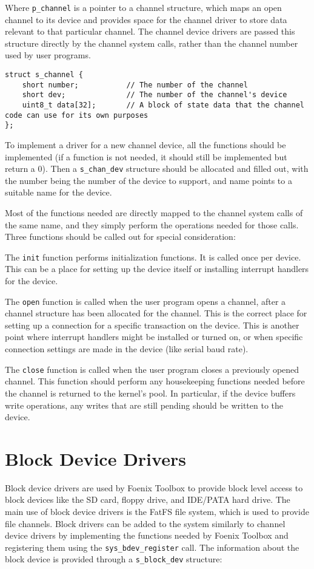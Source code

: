 Where \verb+p_channel+ is a pointer to a channel structure, which maps an open channel to its device and provides space for the channel driver to store data relevant to that particular channel. The channel device drivers are passed this structure directly by the channel system calls, rather than the channel number used by user programs.

\begin{lstlisting}
struct s_channel {
    short number;           // The number of the channel
    short dev;              // The number of the channel's device
    uint8_t data[32];       // A block of state data that the channel code can use for its own purposes
};
\end{lstlisting}

To implement a driver for a new channel device, all the functions should be implemented (if a function is not needed,
it should still be implemented but return a 0). Then a \verb+s_chan_dev+ structure should be allocated and filled out,
with the number being the number of the device to support, and name points to a suitable name for the device.

Most of the functions needed are directly mapped to the channel system calls of the same name, and they simply perform
the operations needed for those calls. Three functions should be called out for special consideration:

The \verb+init+ function performs initialization functions. It is called once per device.
This can be a place for setting up the device itself or installing interrupt handlers for the device.

The \verb+open+ function is called when the user program opens a channel, after a channel structure has been allocated for the channel.
This is the correct place for setting up a connection for a specific transaction on the device. This is another point where interrupt handlers might be installed or turned on, or when specific connection settings are made in the device (like serial baud rate).

The \verb+close+ function is called when the user program closes a previously opened channel.
This function should perform any housekeeping functions needed before the channel is returned to the kernel's pool.
In particular, if the device buffers write operations, any writes that are still pending should be written to the device.

\section{Block Device Drivers}
Block device drivers are used by Foenix Toolbox to provide block level access to block devices like the SD card, floppy drive, and IDE/PATA hard drive.
The main use of block device drivers is the FatFS file system, which is used to provide file channels.
Block drivers can be added to the system similarly to channel device drivers by implementing the functions needed by Foenix Toolbox and
registering them using the \verb+sys_bdev_register+ call.
The information about the block device is provided through a \verb+s_block_dev+ structure:

